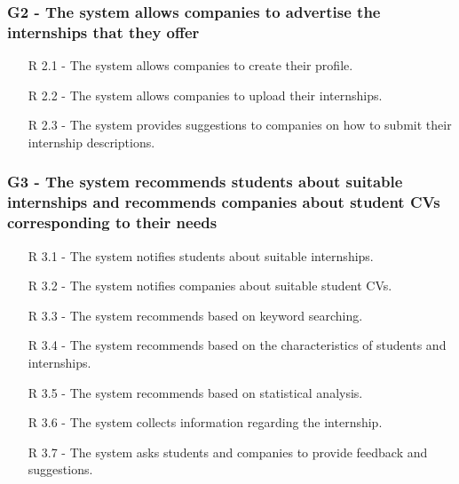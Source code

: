 \subsubsection{G2 - The system allows companies to advertise the internships that they offer}
\hspace*{15mm}
\begin{itemize}
    \item [R 2.1] - The system allows companies to create their profile.
    \item [R 2.2] - The system allows companies to upload their internships.
    \item [R 2.3] - The system provides suggestions to companies on how to submit their internship descriptions.
\end{itemize}
\hspace*{15mm}

\subsubsection{G3 - The system recommends students about suitable internships and recommends
companies about student CVs corresponding to their needs}
\hspace*{15mm}
\begin{itemize}
    \item [R 3.1] - The system notifies students about suitable internships.
    \item [R 3.2] - The system notifies companies about suitable student CVs.
    \item [R 3.3] - The system recommends based on keyword searching.
    \item [R 3.4] - The system recommends based on the characteristics of students and internships.
    \item [R 3.5] - The system recommends based on statistical analysis.
    \item [R 3.6] - The system collects information regarding the internship.
    \item [R 3.7] - The system asks students and companies to provide feedback and suggestions.
\end{itemize}
\hspace*{15mm}

